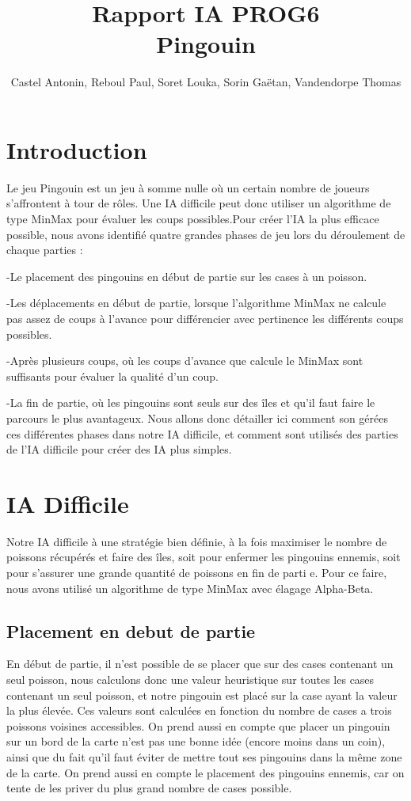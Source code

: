 \documentclass{report}
\title{\textbf{Rapport IA PROG6}\\Pingouin}
\author{Castel Antonin, Reboul Paul, Soret Louka, Sorin Gaëtan, Vandendorpe Thomas}
\begin{document}
\maketitle{}
\tableofcontents
\chapter{Introduction}
Le jeu Pingouin est un jeu à somme nulle où un certain nombre de joueurs s'affrontent à tour de rôles. Une IA difficile peut donc utiliser un algorithme de type MinMax pour évaluer les coups possibles.Pour créer l'IA la plus efficace possible, nous avons identifié quatre grandes phases de jeu lors du déroulement de chaque parties :

-Le placement des pingouins en début de partie sur les cases à un poisson.

-Les déplacements en début de partie, lorsque l'algorithme MinMax ne calcule pas assez de coups à l'avance pour différencier avec pertinence les différents coups possibles.

-Après plusieurs coups, où les coups d'avance que calcule le MinMax sont 
suffisants pour évaluer la qualité d'un coup.

-La fin de partie, où les pingouins sont seuls sur des îles et qu'il faut faire le parcours le plus avantageux.
Nous allons donc détailler ici comment son gérées ces différentes phases dans notre IA difficile, et comment sont utilisés des parties de l'IA difficile pour créer des IA plus simples.
\chapter{IA Difficile}
Notre IA difficile à une stratégie bien définie, à la fois maximiser le nombre de poissons récupérés et faire des îles, soit pour enfermer les pingouins ennemis, soit pour s'assurer une grande quantité de poissons en fin de parti\setlength{\topmargin}{0cm}
e.
Pour ce faire, nous avons utilisé un algorithme de type MinMax avec élagage Alpha-Beta.
\section{Placement en debut de partie}
En début de partie, il n'est possible de se placer que sur des cases contenant un seul poisson, nous calculons donc une valeur heuristique sur toutes les cases contenant un seul poisson, et notre pingouin est placé sur la case ayant la valeur la plus élevée.
Ces valeurs sont calculées en fonction du nombre de cases a trois poissons voisines accessibles. 
\newline
On prend aussi en compte que placer un pingouin sur un bord de la carte n'est pas une bonne idée (encore moins dans un coin), ainsi que du fait qu'il faut éviter de mettre tout ses pingouins dans la même zone de la carte.
\newline
On prend aussi en compte le placement des pingouins ennemis, car on tente de les priver du plus grand nombre de cases possible.
\end{document}
